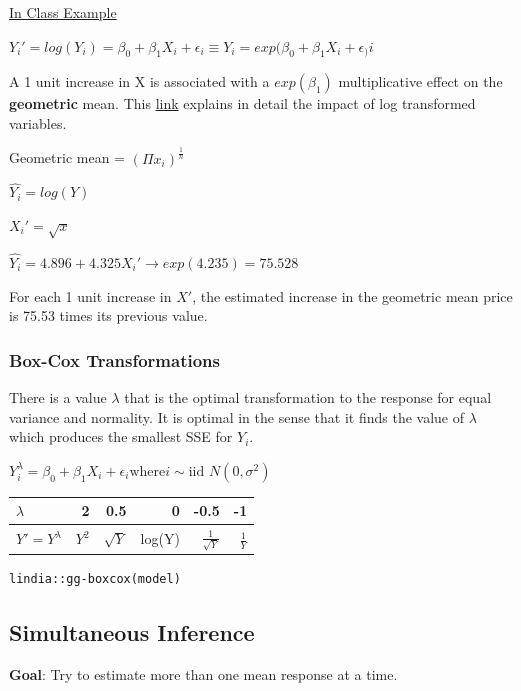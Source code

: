 \documentclass[11pt]{article}
\begin{document}
\uline{In Class Example}

\(Y_i' = log(Y_i) = \beta_0 + \beta_1 X_i + \epsilon_i \equiv Y_i = exp(\beta_0 +
\beta_1 X_i + \epsilon_)i\)

A 1 unit increase in X is associated with a \(exp(\beta_1)\) multiplicative effect
on the \textbf{geometric} mean. This \href{https://stats.idre.ucla.edu/other/mult-pkg/faq/general/faqhow-do-i-interpret-a-regression-model-when-some-variables-are-log-transformed/}{link} explains in detail the impact of log
transformed variables.

Geometric mean = \((\Pi x_i)^\frac{1}{n}\)

\(\hat{Y_i} = log(Y)\)

\(X_i' = \sqrt{x}\)

\(\hat{Y_i} = 4.896 + 4.325 X_i' \to exp(4.235) = 75.528\)

For each 1 unit increase in \(X'\), the estimated increase in the geometric mean
price is 75.53 times its previous value.

\subsubsection{Box-Cox Transformations}
\label{sec:org23410fa}
There is a value \(\lambda\) that is the optimal transformation to the response
for equal variance and normality. It is optimal in the sense that it finds the
value of \(\lambda\) which produces the smallest SSE for \(Y_i\).

\(Y_i^{\lambda} = \beta_0 + \beta_1 X_i + \epsilon_i \text{where} i \sim
\text{iid } N(0,
\sigma^2)\)

\begin{center}
\begin{tabular}{lrrrrr}
\(\lambda\) & 2 & 0.5 & 0 & -0.5 & -1\\
\hline
\(Y' = Y^{\lambda}\) & \(Y^2\) & \(\sqrt{Y}\) & log(Y) & \(\frac{1}{\sqrt{Y}}\) & \(\frac{1}{Y}\)\\
\end{tabular}
\end{center}

\begin{verbatim}
lindia::gg-boxcox(model)
\end{verbatim}

\subsection{Simultaneous Inference}
\label{sec:orgb8289b6}
\textbf{Goal}: Try to estimate more than one mean response at a time.
\end{document}
